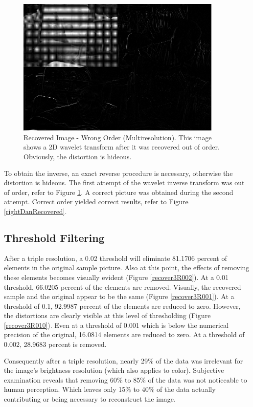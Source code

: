 \begin{figure}[htb]
\begin{center}
\includegraphics [width=4in]{recoverHid.jpg}
\end{center}
\caption{Recovered Image - Wrong Order (Multiresolution). This image shows a 2D wavelet transform after it was recovered out of order.  Obviously, the distortion is hideous.  }
\label{recoverHid}
\end{figure}

To obtain the inverse, an exact reverse procedure is necessary, otherwise the distortion is hideous.   The first attempt of the wavelet inverse transform was out of order, refer to Figure \ref{recoverHid}.  A correct picture was obtained during the second attempt.  Correct order yielded correct results, refer to Figure \ref{rightDanRecovered}.



\subsection {Threshold Filtering}
After a triple resolution, a 0.02 threshold will eliminate 81.1706 percent of elements in the original sample picture.  Also at this point, the effects of removing these elements becomes visually evident (Figure \ref{recover3R002}).  At a 0.01 threshold,  66.0205 percent of the elements are removed.  Visually, the recovered sample and the original appear to be the same (Figure \ref{recover3R001}).  At a threshold of 0.1, 92.9987 percent of the elements are reduced to zero.  However, the distortions are clearly visible at this level of thresholding (Figure \ref{recover3R010}).  Even at a threshold of 0.001 which is below the numerical precision of the original, 16.0814 elements are reduced to zero.  At a threshold of 0.002, 28.9683 percent is removed.  

Consequently after a triple resolution, nearly 29\% of the data was irrelevant for the image's brightness resolution (which also applies to color).  Subjective examination reveals that removing 60\% to 85\% of the data was not noticeable to human perception.  Which leaves only 15\% to 40\% of the data actually contributing or being necessary to reconstruct the image.   

